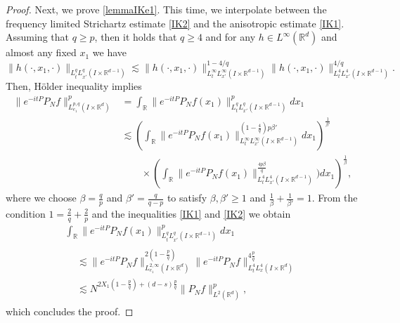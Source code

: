 \documentclass[10pt,leqno]{amsart}
\newcommand{\R}{\mathbb{R}} %
\numberwithin{equation}{section}
\begin{document}
\begin{proof}
Next, we prove  \eqref{lemmaIKe1}. This time, we interpolate between the frequency limited Strichartz estimate \eqref{IK2} and the anisotropic estimate \eqref{IK1}. Assuming that $q \geq p$, then it holds that $q \geq 4$ and for any $h\in L^\infty (\R^d )$ and almost any fixed \(x_{1}\) we have
$$\|h (\cdot,x_{1},\cdot)\|_{L^q_{t}L^{q}_{x'} (I\times \R^{d-1})} \lesssim \|h(\cdot,x_{1},\cdot) \|_{L^\infty_{t}L^{\infty}_{x'} (I\times \R^{d-1} )}^{1-4/q} \|h(\cdot,x_{1},\cdot)\|_{L^4_{t}L^{4}_{x'} (I\times \R^{d-1} )}^{4/q}.$$
Then,  H\" older inequality implies
\begin{align*}
\big\|e^{-it P } P_N  f\big\|_{L^{p,q}_{e_{1}} (I\times\R^{d})}^{p}
&= \int_{\R} \big\|e^{-it P }  P_N f(x_{1}) \big\|_{L^q_{t}L^{q}_{x'} (I \times \R^{d-1})}^p dx_1
\\ 
&\lesssim \left(\int_\R \|e^{-it P }  P_N f(x_{1}) \|_{L^\infty_{t}L^{\infty}_{x'} (I\times \R^{d-1})}^{(1- \frac{4}{q})p \beta'} dx_{1} \right)^{\frac{1}{\beta'}}
\\ &\qquad \times \left(\int_{\R} \|e^{-it P }  P_N f(x_{1}) \|_{L^4_{t}L^{4}_{x'} (I\times \R^{d-1})}^{\frac{4p \beta}{q}}) dx_{1} \right)^{\frac{1}{\beta}},
\end{align*}
where we choose $\beta=\frac{q}{p}$ and $\beta' = \frac{q}{q-p}$ to satisfy \(\beta,\beta'\geq1\) and \(\frac{1}{\beta}+\frac{1}{\beta'}=1\). From the condition $1= \frac{2}{q} +\frac{2}{p}$ and the inequalities \eqref{IK1} and \eqref{IK2} we obtain
\begin{multline*}
\int_\R \|e^{-it P}  P_N f(x_{1}) \|_{L^q_{t}L^{q}_{x'} (I\times \R^{d-1})}^p dx_1 \\
\begin{aligned}
& \lesssim \|e^{-it P }  P_N f \|_{L^{2,\infty}_{e_{1}} (I\times \R^d )}^{2(1-\frac{p}{q})} \|e^{-it P }  P_N f \|_{L^4_{t}L^{4}_{x} (I\times \R^d)}^{4\frac{ p}{q}} \\
&\lesssim N^{2X_1 (1-\frac{p}{q}) +(d-s) \frac{p}{q} } \|P_N f\|_{L^2 (\R^d)}^p ,
\end{aligned}
\end{multline*}
which concludes the proof.
\end{proof}
\end{document}
